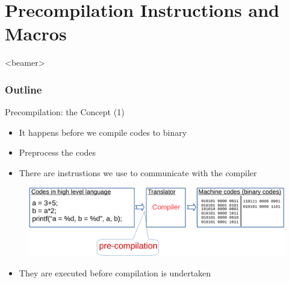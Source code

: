 \section{Precompilation Instructions and Macros}
\label{sec:macro}
\begin{frame}<beamer>
    \frametitle{Outline}
    \tableofcontents[currentsection]
\end{frame}
\begin{frame}{Precompilation: the Concept (1)}
\begin{itemize}
	\item {It happens before we compile codes to binary}
	\item {Preprocess the codes}
	\item {There are instrustions we use to communicate with the compiler}
\end{itemize}

\begin{figure}
	\includegraphics[width=0.9\linewidth]{figs/compil1.pdf}
\end{figure}

\begin{itemize}
	\item {They are executed before compilation is undertaken}
\end{itemize}

\end{frame}

